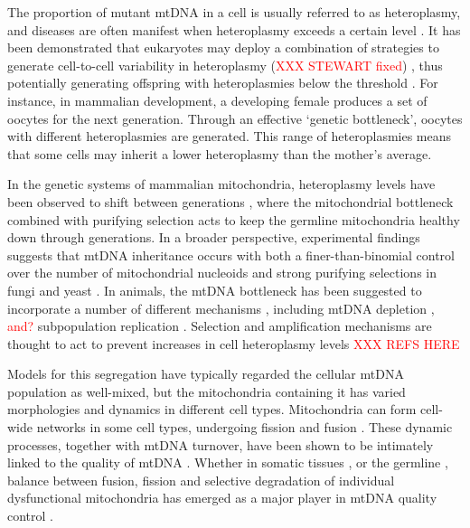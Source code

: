\documentclass{article}
\begin{document}
The proportion of mutant mtDNA in a cell is usually referred to as heteroplasmy, and diseases are often manifest when heteroplasmy exceeds a certain level \citep{rossignol2003mitochondrial}. It has been demonstrated that eukaryotes may deploy a combination of strategies to generate cell-to-cell variability in heteroplasmy (\textcolor{red}{XXX STEWART fixed}) \citep{stewart2015dynamics, radzvilavicius2017mitigating, johnston2019varied, edwards2021avoiding}, thus potentially generating offspring with heteroplasmies below the threshold \citep{burr2018mitochondrial, burgstaller2014mtdna, segui2009mitochondrial}. For instance, in mammalian development, a developing female produces a set of oocytes for the next generation. Through an effective `genetic bottleneck', oocytes with different heteroplasmies are generated. This range of heteroplasmies means that some cells may inherit a lower heteroplasmy than the mother's average.

In the genetic systems of mammalian mitochondria, heteroplasmy levels have been observed to shift between generations \citep{burgstaller2018large, wei2019germline}, where the mitochondrial bottleneck \citep{johnston2015stochastic, johnston2019varied} combined with purifying selection \citep{fan2008mouse, stewart2008strong, hill2014selective, floros2018segregation, lieber2019mitochondrial} acts to keep the germline mitochondria healthy down through generations. In a broader perspective, experimental findings suggests that mtDNA inheritance occurs with both a finer-than-binomial control over the number of mitochondrial nucleoids \citep{jajoo2016accurate} and strong purifying selections \citep{jakubke2021cristae} in fungi and yeast \citep{mendoza2020mitochondrial}. In animals, the mtDNA bottleneck has been suggested to incorporate a number of different mechanisms \cite{johnston2015stochastic}, including mtDNA depletion \citep{cree2008reduction, cao2007mitochondrial, cao2009new}, \textcolor{red}{and?} subpopulation replication \citep{cao2007mitochondrial, wai2008mitochondrial}. Selection and amplification mechanisms are thought to act to prevent increases in cell heteroplasmy levels \textcolor{red}{XXX REFS HERE \citep{stewart2015dynamics,stewart2008strong}}

Models for this segregation have typically regarded the cellular mtDNA population as well-mixed, but the mitochondria containing it has varied morphologies and dynamics in different cell types. Mitochondria can form cell-wide networks in some cell types, undergoing fission and fusion \citep{ mendoza2020mitochondrial, sukhorukov2012emergence, hoitzing2015function, zamponi2018mitochondrial, carlton2020membrane}. These dynamic processes, together with mtDNA turnover, have been shown to be intimately linked to the quality of mtDNA \citep{jakubke2021cristae,pla2019reshaping, chapman2020maintenance}. Whether in somatic tissues \citep{mouli2009frequency, tam2013mathematical, patel2013optimal, tam2015context}, or the germline \citep{edwards2021avoiding, lieber2019mitochondrial}, balance between fusion, fission and selective degradation of individual dysfunctional mitochondria has emerged as a major player in mtDNA quality control \citep{mouli2009frequency,patel2013optimal,twig2008fission, twig2008mitochondrial, figge2012deceleration}. 
\end{document}
